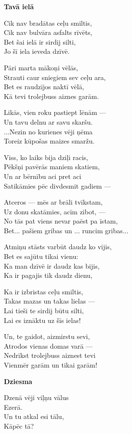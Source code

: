 \documentclass[11pt]{article}
\begin{document}
{\newpage

{\bf Tavā ielā}

Cik nav bradātas ceļu smiltis,\\
Cik nav bulvāra asfalts rīvēts,\\
Bet šai ielā ir sirdij silti,\\
Jo šī iela ieveda dzīvē. 

Pāri marta mākoņi vēlās,\\
Strauti caur sniegiem sev ceļu ara,\\
Bet es raudzījos naktī vēlā,\\
Kā tevi trolejbuss aiznes garām. 

Likās, vien roku pastiept lēnām ---\\
Un tavu delnu ar savu skaršu.\\
...Nezin no kurienes vēji ņēma\\
Toreiz kūpošas maizes smaržu.

Viss, ko laiks bija dziļi racis,\\
Pēkšņi pavērās maniem skatiem,\\
Un ar bērnību aci pret aci\\
Satikāmies pēc divdesmit gadiem ---

Atceros --- mēs ar brāli tvīkstam,\\
Uz donu skatāmies, acīm zibot, ---\\
No tās pat viens nevar paēst pa īstam,\\
Bet... pašiem gribas un ... runcim gribas...

Atmiņu stāsts varbūt daudz ko vijis,\\
Bet es sajūtu tikai vienu:\\
Ka man dzīvē ir daudz kas bijis,\\
Ka ir pagajis tik daudz dienu,

Ka ir izbristas ceļu smiltis,\\
Takas mazas un takas lielas ---\\
Lai tieši te sirdij būtu silti,\\
Lai es iznāktu uz šīs ielas!

Un, te gaidot, aizmirstu sevi,\\
Atrodos vienas domas varā ---\\
Nedrīkst trolejbuss aiznest tevi\\
Vienmēr garām un tikai garām!


\newpage

{\bf Dziesma}

Dzenā vēji viļņu vālus\\
\mbox{}\hspace{10pt} Ezerā.\\
Un tu atkal esi tālu,\\
\mbox{}\hspace{10pt} Kāpēc tā?

}
\end{document}
